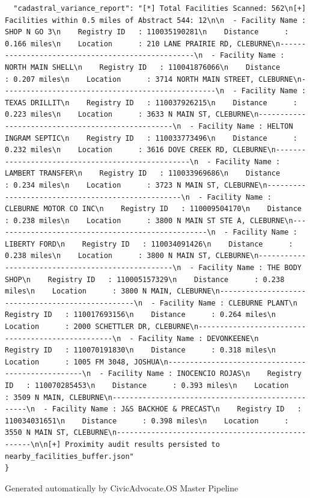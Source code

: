 \documentclass{article}
\begin{document}
\begin{verbatim}
  "cadastral_variance_report": "[*] Total Facilities Scanned: 562\n[+] Facilities within 0.5 miles of Abstract 544: 12\n\n  - Facility Name : SHOP N GO 3\n    Registry ID   : 110035190281\n    Distance      : 0.166 miles\n    Location      : 210 LANE PRAIRIE RD, CLEBURNE\n--------------------------------------------------\n  - Facility Name : NORTH MAIN SHELL\n    Registry ID   : 110041876066\n    Distance      : 0.207 miles\n    Location      : 3714 NORTH MAIN STREET, CLEBURNE\n--------------------------------------------------\n  - Facility Name : TEXAS DRILLIT\n    Registry ID   : 110037926215\n    Distance      : 0.223 miles\n    Location      : 3633 N MAIN ST, CLEBURNE\n--------------------------------------------------\n  - Facility Name : HELTON INGRAM SEPTIC\n    Registry ID   : 110033773496\n    Distance      : 0.232 miles\n    Location      : 3616 DOVE CREEK RD, CLEBURNE\n--------------------------------------------------\n  - Facility Name : LAMBERT TRANSFER\n    Registry ID   : 110033969686\n    Distance      : 0.234 miles\n    Location      : 3723 N MAIN ST, CLEBURNE\n--------------------------------------------------\n  - Facility Name : CLEBURNE MOTOR CO INC\n    Registry ID   : 110009504170\n    Distance      : 0.238 miles\n    Location      : 3800 N MAIN ST STE A, CLEBURNE\n--------------------------------------------------\n  - Facility Name : LIBERTY FORD\n    Registry ID   : 110034091426\n    Distance      : 0.238 miles\n    Location      : 3800 N MAIN ST, CLEBURNE\n--------------------------------------------------\n  - Facility Name : THE BODY SHOP\n    Registry ID   : 110005157329\n    Distance      : 0.238 miles\n    Location      : 3800 N MAIN, CLEBURNE\n--------------------------------------------------\n  - Facility Name : CLEBURNE PLANT\n    Registry ID   : 110017693156\n    Distance      : 0.264 miles\n    Location      : 2000 SCHETTLER DR, CLEBURNE\n--------------------------------------------------\n  - Facility Name : DEVONKEENE\n    Registry ID   : 110070191830\n    Distance      : 0.318 miles\n    Location      : 1005 FM 3048, JOSHUA\n--------------------------------------------------\n  - Facility Name : INOCENCIO ROJAS\n    Registry ID   : 110070285453\n    Distance      : 0.393 miles\n    Location      : 3509 N MAIN, CLEBURNE\n--------------------------------------------------\n  - Facility Name : J&S BACKHOE & PRECAST\n    Registry ID   : 110034031651\n    Distance      : 0.398 miles\n    Location      : 3550 N MAIN ST, CLEBURNE\n--------------------------------------------------\n\n[+] Proximity audit results persisted to nearby_facilities_buffer.json"
}
\end{verbatim}


\vfill
\begin{center}
\footnotesize{Generated automatically by CivicAdvocate.OS Master Pipeline}
\end{center}
\end{document}
